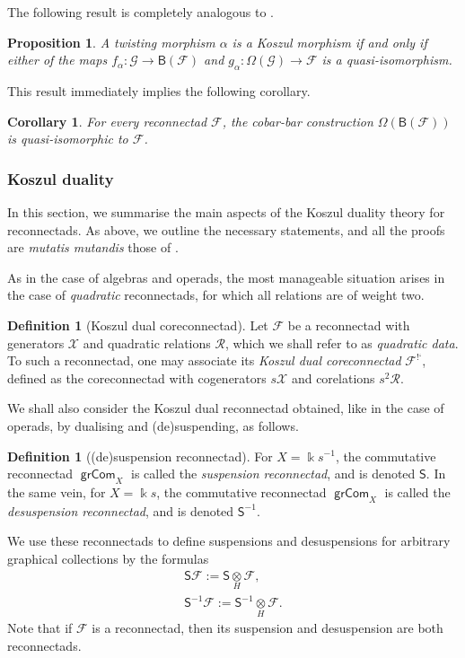 \documentclass[11pt]{article}
\newtheorem{prop}[theo]{Proposition}
\newtheorem{coro}[theo]{Corollary}
\theoremstyle{definition}
\newtheorem{defi}[theo]{Definition}
\numberwithin{equation}{section}
\newcommand\calF{\mathcal{F}}
\newcommand\calG{\mathcal{G}}
\newcommand\calR{\mathcal{R}}
\newcommand\calX{\mathcal{X}}
\DeclareMathOperator{\grCom}{\mathsf{grCom}}
\newcommand\kk{\Bbbk}
\begin{document}
The following result is completely analogous to \cite[Th.~6.6.2]{MR2954392}.

\begin{prop}
A twisting morphism $\alpha$ is a Koszul morphism if and only if either of the maps $f_\alpha\colon\calG\to\mathsf{B}(\calF)$ and $g_\alpha\colon\Omega(\calG)\to\calF$ is a quasi-isomorphism.
\end{prop}

This result immediately implies the following corollary.

\begin{coro}
For every reconnectad $\calF$, the cobar-bar construction $\Omega(\mathsf{B}(\calF))$ is quasi-isomorphic to $\calF$. 
\end{coro}

\subsubsection{Koszul duality}

In this section, we summarise the main aspects of the Koszul duality theory for reconnectads. As above, we outline the necessary statements, and all the proofs are \emph{mutatis mutandis} those of \cite[Chap.~7]{MR2954392}. 

As in the case of algebras and operads, the most manageable situation arises in the case of \emph{quadratic} reconnectads, for which all relations are of weight two. 

\begin{defi}[Koszul dual coreconnectad]
Let $\calF$ be a reconnectad with generators $\calX$ and quadratic relations $\calR$, which we shall refer to as \emph{quadratic data}. To such a reconnectad, one may associate its \emph{Koszul dual coreconnectad} $\calF^{\text{!`}}$, defined as the coreconnectad with cogenerators $s\calX$ and corelations $s^2\calR$. 
\end{defi}

We shall also consider the Koszul dual reconnectad obtained, like in the case of operads, by dualising and (de)suspending, as follows.

\begin{defi}[(de)suspension reconnectad] For $X=\kk s^{-1}$, the commutative reconnectad $\grCom_X$ is called the \emph{suspension reconnectad}, and is denoted $\mathsf{S}$. In the same vein, for $X=\kk s$, the commutative reconnectad $\grCom_X$ is called the \emph{desuspension reconnectad}, and is denoted $\mathsf{S}^{-1}$. 

We use these reconnectads to define suspensions and desuspensions for arbitrary graphical collections by the formulas
\begin{gather*}
\mathsf{S}\calF:=\mathsf{S}\underset{H}{\otimes}\calF,\\
\mathsf{S}^{-1}\calF:=\mathsf{S}^{-1}\underset{H}{\otimes}\calF.
\end{gather*}
Note that if $\calF$ is a reconnectad, then its suspension and desuspension are both reconnectads.
\end{defi} 
\end{document}
